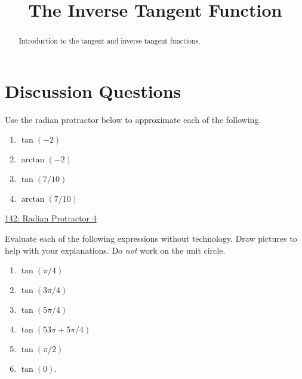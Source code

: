 \documentclass{ximera}
\title{The Inverse Tangent Function}
\begin{document}
\begin{abstract}
Introduction to the tangent and inverse tangent functions.
\end{abstract}
\maketitle



\section{Discussion Questions}

\begin{question} \label{Q45dsfTRETFGree}
Use the radian protractor below to approximate each of the following.
\begin{enumerate}
\item $\tan(-2)$

\item $\arctan(-2)$

\item $\tan(7/10)$

\item $\arctan(7/10)$
\end{enumerate}

\href{https://www.desmos.com/calculator/tb0hegzfdv}{142: Radian Protractor 4}
 
\begin{onlineOnly}
    \begin{center}
\end{center}
\end{onlineOnly}
\end{question}


\begin{question} \label{QDFrLMDndvvV}
Evaluate each of the following expressions without technology. Draw pictures to help with your explanations. Do \emph{not} work on the unit circle.

\begin{enumerate}
\item $\tan(\pi/4)$

\item $\tan(3\pi/4)$

\item $\tan(5\pi/4)$

\item $\tan(53\pi + 5\pi/4)$

\item $\tan(\pi/2)$

\item $\tan(0)$.

\end{enumerate}
\end{question}
\end{document}

